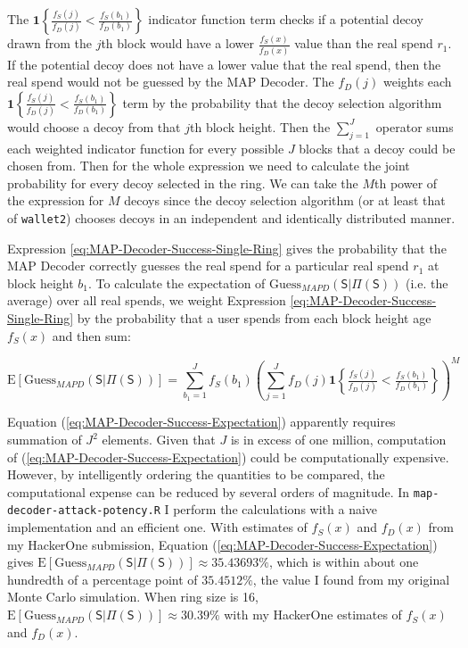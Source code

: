 \documentclass[english]{article}
\begin{document}
The $\mathbf{1}\left\{ \tfrac{f_{S}\left(j\right)}{f_{D}\left(j\right)}<\tfrac{f_{S}\left(b_{1}\right)}{f_{D}\left(b_{1}\right)}\right\} $
indicator function term checks if a potential decoy drawn from the
$j$th block would have a lower $\tfrac{f_{S}\left(x\right)}{f_{D}\left(x\right)}$
value than the real spend $r_{1}$. If the potential decoy does not
have a lower value that the real spend, then the real spend would
not be guessed by the MAP Decoder. The $f_{D}\left(j\right)$ weights
each $\mathbf{1}\left\{ \tfrac{f_{S}\left(j\right)}{f_{D}\left(j\right)}<\tfrac{f_{S}\left(b_{1}\right)}{f_{D}\left(b_{1}\right)}\right\} $
term by the probability that the decoy selection algorithm would choose
a decoy from that $j$th block height. Then the $\sum_{j=1}^{J}$
operator sums each weighted indicator function for every possible
$J$ blocks that a decoy could be chosen from. Then for the whole
expression we need to calculate the joint probability for every decoy
selected in the ring. We can take the $M$th power of the expression
for $M$ decoys since the decoy selection algorithm (or at least that
of \texttt{wallet2}) chooses decoys in an independent and identically
distributed manner.

Expression \ref{eq:MAP-Decoder-Success-Single-Ring} gives the probability
that the MAP Decoder correctly guesses the real spend for a particular
real spend $r_{1}$ at block height $b_{1}$. To calculate the expectation
of $\mathrm{Guess}_{MAPD}\left(\mathsf{S}|\Pi(\mathsf{S})\right)$
(i.e. the average) over all real spends, we weight Expression \ref{eq:MAP-Decoder-Success-Single-Ring}
by the probability that a user spends from each block height age $f_{S}\left(x\right)$
and then sum: 

\begin{equation}
\mathrm{E}\left[\mathrm{Guess}_{MAPD}\left(\mathsf{S}|\Pi(\mathsf{S})\right)\right]=\sum_{b_{1}=1}^{J}f_{S}\left(b_{1}\right)\left(\sum_{j=1}^{J}f_{D}\left(j\right)\mathbf{1}\left\{ \tfrac{f_{S}\left(j\right)}{f_{D}\left(j\right)}<\tfrac{f_{S}\left(b_{1}\right)}{f_{D}\left(b_{1}\right)}\right\} \right)^{M}\label{eq:MAP-Decoder-Success-Expectation}
\end{equation}

Equation (\ref{eq:MAP-Decoder-Success-Expectation}) apparently requires
summation of $J^{2}$ elements. Given that $J$ is in excess of one
million, computation of (\ref{eq:MAP-Decoder-Success-Expectation})
could be computationally expensive. However, by intelligently ordering
the quantities to be compared, the computational expense can be reduced
by several orders of magnitude. In \texttt{map-decoder-attack-potency.R}
I perform the calculations with a naive implementation and an efficient
one. With estimates of $f_{S}(x)$ and $f_{D}(x)$ from my HackerOne
submission, Equation (\ref{eq:MAP-Decoder-Success-Expectation}) gives
$\mathrm{E}\left[\mathrm{Guess}_{MAPD}\left(\mathsf{S}|\Pi(\mathsf{S})\right)\right]\approx35.43693\%$,
which is within about one hundredth of a percentage point of $35.4512\%$,
the value I found from my original Monte Carlo simulation. When ring
size is 16, $\mathrm{E}\left[\mathrm{Guess}_{MAPD}\left(\mathsf{S}|\Pi(\mathsf{S})\right)\right]\approx30.39\%$
with my HackerOne estimates of $f_{S}(x)$ and $f_{D}(x)$.
\end{document}

